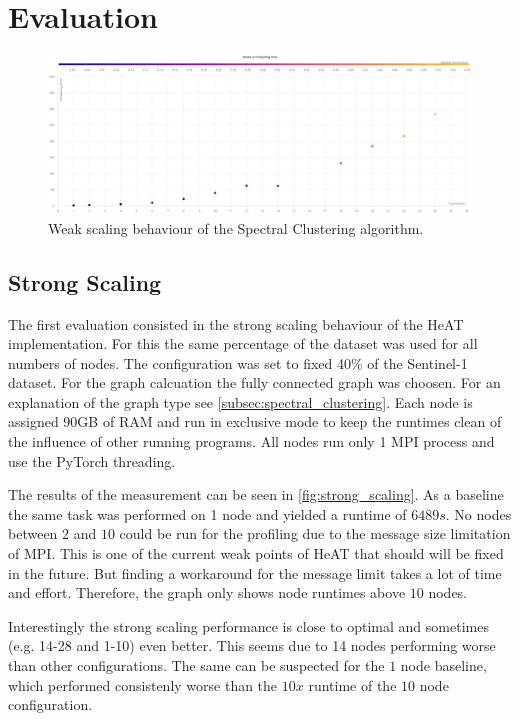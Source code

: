 \section{Evaluation}
\label{sec:evaluation}


\begin{figure}
  \includegraphics[width=0.9\linewidth]{images/weak_scaling_chart.png}
  \caption{Weak scaling behaviour of the Spectral Clustering algorithm.}\label{fig:weak_scaling}
\end{figure}


\subsection{Strong Scaling}
\label{subsec:strong_scaling}


The first evaluation consisted in the strong scaling behaviour of the \gls{HeAT} implementation.
For this the same percentage of the dataset was used for all numbers of nodes.
The configuration was set to fixed 40\% of the Sentinel-1 dataset.
For the graph calcuation the fully connected graph was choosen. For an explanation of the graph type see \cref{subsec:spectral_clustering}.
Each node is assigned 90GB of \gls{RAM} and run in exclusive mode to keep the runtimes clean of the influence of other running programs.
All nodes run only 1 \gls{MPI} process and use the \gls{PyTorch} threading.

The results of the measurement can be seen in \cref{fig:strong_scaling}. As a baseline the same task was performed on 1 node and yielded a runtime of \(6489s\).
No nodes between \(2\) and \(10\) could be run for the profiling due to the message size limitation of \gls{MPI}. This is one of the current weak points
of \gls{HeAT} that should will be fixed in the future. But finding a workaround for the message limit takes a lot of time and effort.
Therefore, the graph only shows node runtimes above \(10\) nodes.

Interestingly the strong scaling performance is close to optimal and sometimes (e.g. 14-28 and 1-10) even better.
This seems due to 14 nodes performing worse than other configurations.
The same can be suspected for the \(1\) node baseline, which performed consistenly worse than the \(10x\) runtime of the \(10\) node configuration.

